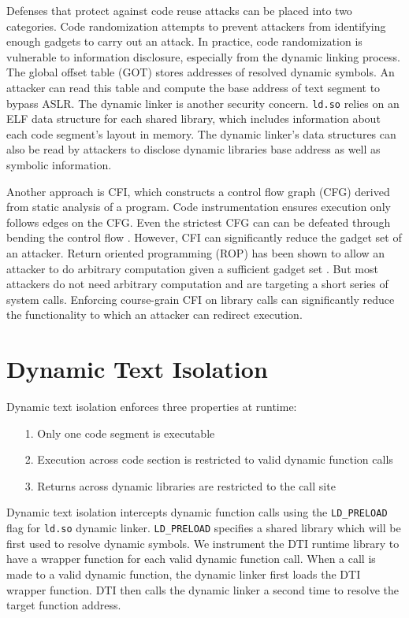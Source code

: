 \documentclass[letterpaper,twocolumn,10pt]{article}
\begin{document}
Defenses that protect against code reuse attacks can be placed into two categories. Code randomization attempts to prevent attackers from identifying enough gadgets to carry out an attack. In practice, code randomization is vulnerable to information disclosure, especially from the dynamic linking process. The global offset table (GOT) stores addresses of resolved dynamic symbols. An attacker can read this table and compute the base address of text segment to bypass ASLR. The dynamic linker is another security concern. {\tt ld.so} relies on an ELF data structure for each shared library,  which includes information about each code segment's layout in memory. The dynamic linker's data structures can also be read by attackers to disclose dynamic libraries base address as well as symbolic information. 

Another approach is CFI, which constructs a control flow graph (CFG) derived from static analysis of a program. Code instrumentation ensures execution only follows edges on the CFG. Even the strictest CFG can can be defeated through bending the control flow \cite{bending}. However, CFI can significantly reduce the gadget set of an attacker. Return oriented programming (ROP) has been shown to allow an attacker to do arbitrary computation given a sufficient gadget set \cite{bending}. But most attackers do not need arbitrary computation and are targeting a short series of system calls. Enforcing course-grain CFI on library calls can significantly reduce the functionality to which an attacker can redirect execution.

\section{Dynamic Text Isolation}

    Dynamic text isolation enforces three properties at runtime: 
    \begin{enumerate}
        \item[1.] Only one code segment is executable
        \item[2.] Execution across code section is restricted to valid dynamic function calls
        \item[3.] Returns across dynamic libraries are restricted to the call site
    \end{enumerate}
    
    Dynamic text isolation intercepts dynamic function calls using the {\tt LD\_PRELOAD} flag for {\tt ld.so} dynamic linker. {\tt LD\_PRELOAD} specifies a shared library which will be first used to resolve dynamic symbols. We instrument the DTI runtime library to have a wrapper function for each valid dynamic function call. When a call is made to a valid dynamic function, the dynamic linker first loads the DTI wrapper function. DTI then calls the dynamic linker a second time to resolve the target function address. 
    
\end{document}
